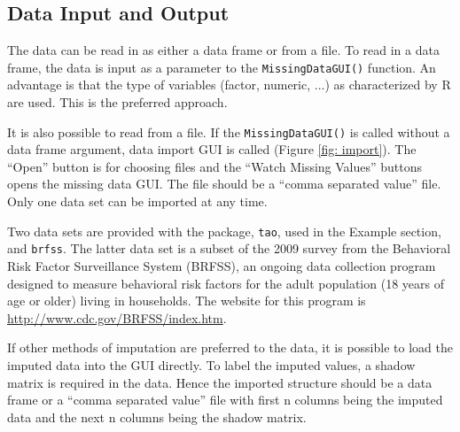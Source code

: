 \documentclass[english]{article}
\begin{document}
\subsection{Data Input and Output}

The data can be read in as either a data frame or from a file. To read in a data frame, the data is input as a parameter to the \texttt{MissingDataGUI()} function.  An advantage is that the type of variables (factor, numeric, ...) as characterized by R are used. This is the preferred approach.

It is also possible to read from a file.  If the \texttt{MissingDataGUI()} is called without a data frame argument, data import GUI is called (Figure \ref{fig: import}).  The ``Open'' button is for choosing files and the ``Watch Missing Values'' buttons opens the missing data GUI. The file should be a ``comma separated value'' file. Only one data set can be imported at any time.

Two data sets are provided with the package, \texttt{tao}, used in the Example section, and \texttt{brfss}. The latter data set is a subset of the 2009 survey from the Behavioral Risk Factor Surveillance System (BRFSS), an ongoing data collection program designed to measure behavioral risk factors for the adult population (18 years of age or older) living in households. The website for this program is \url{http://www.cdc.gov/BRFSS/index.htm}.

If other methods of imputation are preferred to the data, it is possible to load the imputed data into the GUI directly. To label the imputed values, a shadow matrix is required in the data. Hence the imported structure should be a data frame or a ``comma separated value'' file with first n columns being the imputed data and the next n columns being the shadow matrix.
\end{document}
